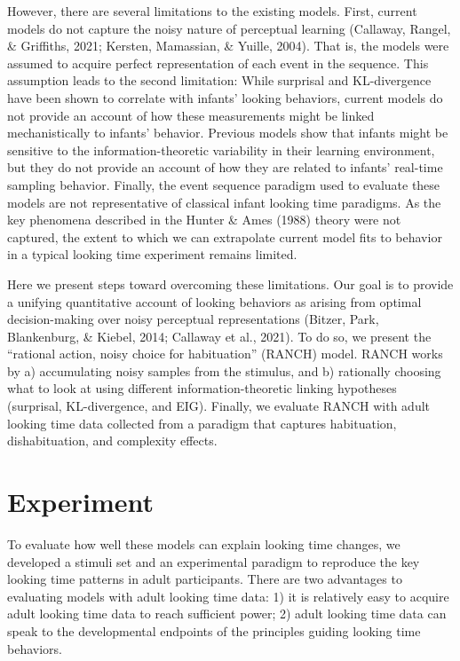 \documentclass[10pt, letterpaper]{article}
\begin{document}
However, there are several limitations to the existing models. First,
current models do not capture the noisy nature of perceptual learning
(Callaway, Rangel, \& Griffiths, 2021; Kersten, Mamassian, \& Yuille,
2004). That is, the models were assumed to acquire perfect
representation of each event in the sequence. This assumption leads to
the second limitation: While surprisal and KL-divergence have been shown
to correlate with infants' looking behaviors, current models do not
provide an account of how these measurements might be linked
mechanistically to infants' behavior. Previous models show that infants
might be sensitive to the information-theoretic variability in their
learning environment, but they do not provide an account of how they are
related to infants' real-time sampling behavior. Finally, the event
sequence paradigm used to evaluate these models are not representative
of classical infant looking time paradigms. As the key phenomena
described in the Hunter \& Ames (1988) theory were not captured, the
extent to which we can extrapolate current model fits to behavior in a
typical looking time experiment remains limited.

Here we present steps toward overcoming these limitations. Our goal is
to provide a unifying quantitative account of looking behaviors as
arising from optimal decision-making over noisy perceptual
representations (Bitzer, Park, Blankenburg, \& Kiebel, 2014; Callaway et
al., 2021). To do so, we present the ``rational action, noisy choice for
habituation'' (RANCH) model. RANCH works by a) accumulating noisy
samples from the stimulus, and b) rationally choosing what to look at
using different information-theoretic linking hypotheses (surprisal,
KL-divergence, and EIG). Finally, we evaluate RANCH with adult looking
time data collected from a paradigm that captures habituation,
dishabituation, and complexity effects.

\hypertarget{experiment}{%
\section{Experiment}\label{experiment}}

To evaluate how well these models can explain looking time changes, we
developed a stimuli set and an experimental paradigm to reproduce the
key looking time patterns in adult participants. There are two
advantages to evaluating models with adult looking time data: 1) it is
relatively easy to acquire adult looking time data to reach sufficient
power; 2) adult looking time data can speak to the developmental
endpoints of the principles guiding looking time behaviors.
\end{document}
